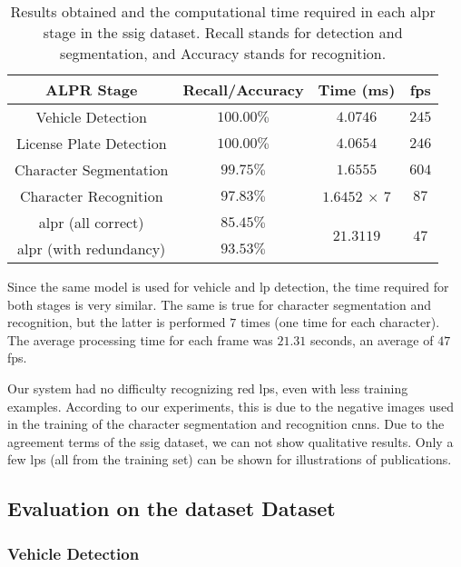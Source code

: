 \begin{table}[!htb]
	\centering
	\caption{Results obtained and the computational time required in each \gls*{alpr} stage in the \gls*{ssig} dataset. Recall stands for detection and segmentation, and Accuracy stands for recognition.}
	\label{tab:ssig_fps}
	\begin{tabular}{@{}cccc@{}}
		\toprule
		ALPR Stage & Recall/Accuracy & Time (ms) & \gls*{fps} \\ \midrule
		Vehicle Detection & $100.00\%$ & $4.0746$ & $245$ \\
		License Plate Detection & $100.00\%$ & $4.0654$ & $246$ \\
		Character Segmentation & $99.75\%$ & $1.6555$ & $604$ \\
		Character Recognition & $97.83\%$ & $1.6452$ $\times$ $7$ & $87$ \\ \midrule
		\gls*{alpr} (all correct) & $85.45\%$ & \multirow{2}{*}{$21.3119$} & \multirow{2}{*}{$47$} \\
		\gls*{alpr} (with redundancy) & $93.53\%$ & & \\ \bottomrule
	\end{tabular}
\end{table}

Since the same model is used for vehicle and \gls*{lp} detection, the time required for both stages is very similar. The same is true for character segmentation and recognition, but the latter is performed $7$ times (one time for each character). The average processing time for each frame was $21.31$ seconds, an average of $47$ \gls*{fps}.

Our system had no difficulty recognizing red \glspl*{lp}, even with less training examples. According to our experiments, this is due to the negative images used in the training of the character segmentation and recognition \glspl*{cnn}. 
Due to the agreement terms of the \gls*{ssig} dataset, we can not show qualitative results. 
Only a few \glspl*{lp} (all from the training set) can be shown for illustrations of publications.

\subsection{Evaluation on the \acrshort*{dataset} Dataset}
\label{dataset:results_ssig}

\subsubsection{Vehicle Detection}

